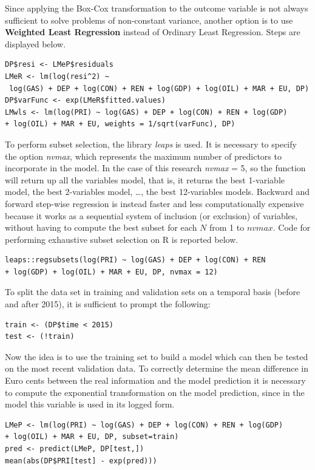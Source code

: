 \documentclass[a4paper,12pt]{book}
\begin{document}
Since applying the Box-Cox transformation to the outcome variable is not always sufficient to solve problems of non-constant variance, another option is to use \textbf{Weighted Least Regression} instead of Ordinary Least Regression. Steps are displayed below.

\begin{verbatim}
DP$resi <- LMeP$residuals
LMeR <- lm(log(resi^2) ~
 log(GAS) + DEP + log(CON) + REN + log(GDP) + log(OIL) + MAR + EU, DP)
DP$varFunc <- exp(LMeR$fitted.values)
LMwls <- lm(log(PRI) ~ log(GAS) + DEP + log(CON) + REN + log(GDP)
+ log(OIL) + MAR + EU, weights = 1/sqrt(varFunc), DP)
\end{verbatim}

To perform subset selection, the library \textit{leaps} is used. It is necessary to specify the option \textit{nvmax}, which represents the maximum number of predictors to incorporate in the model. In the case of this research \textit{nvmax} = 5, so the function will return up all the variables model, that is, it returns the best 1-variable model, the best 2-variables model, …, the best 12-variables models. Backward and forward step-wise regression is instead faster and less computationally expensive because it works as a sequential system of inclusion (or exclusion) of variables, without having to compute the best subset for each $N$ from 1 to $nvmax$. Code for performing exhaustive subset selection on R is reported below.

\begin{verbatim}
leaps::regsubsets(log(PRI) ~ log(GAS) + DEP + log(CON) + REN
+ log(GDP) + log(OIL) + MAR + EU, DP, nvmax = 12)
\end{verbatim}

To split the data set in training and validation sets on a temporal basis (before and after 2015), it is sufficient to prompt the following:

\begin{verbatim}
train <- (DP$time < 2015)
test <- (!train)
\end{verbatim}

Now the idea is to use the training set to build a model which can then be tested on the most recent validation data. To correctly determine the mean difference in Euro cents between the real information and the model prediction it is necessary to compute the exponential transformation on the model prediction, since in the model this variable is used in its logged form.

\begin{verbatim}
LMeP <- lm(log(PRI) ~ log(GAS) + DEP + log(CON) + REN + log(GDP)
+ log(OIL) + MAR + EU, DP, subset=train)
pred <- predict(LMeP, DP[test,])
mean(abs(DP$PRI[test] - exp(pred)))
\end{verbatim}
\end{document}
